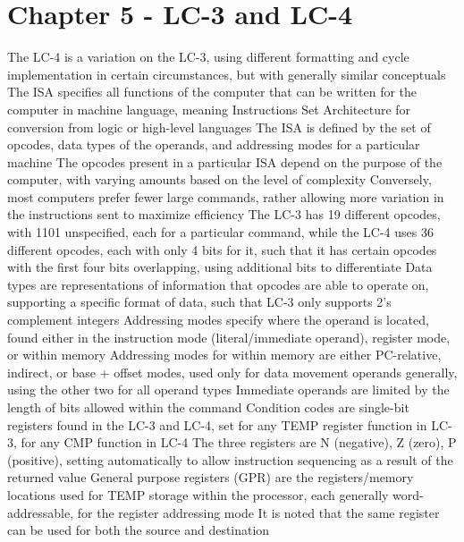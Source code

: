 \documentclass[11 pt, twoside]{article}
\newenvironment{outline*}
{
	\begin{outline}[enumerate]
	}
	{\end{outline}
}
\begin{document}
\section{Chapter 5 - LC-3 and LC-4}
\begin{outline*}
\1 The LC-4 is a variation on the LC-3, using different formatting and cycle implementation in certain circumstances, but with generally similar conceptuals
\1 The ISA specifies all functions of the computer that can be written for the computer in machine language, meaning Instructions Set Architecture for conversion from logic or high-level languages
\2 The ISA is defined by the set of opcodes, data types of the operands, and addressing modes for a particular machine
\1 The opcodes present in a particular ISA depend on the purpose of the computer, with varying amounts based on the level of complexity
\2 Conversely, most computers prefer fewer large commands, rather allowing more variation in the instructions sent to maximize efficiency
\2 The LC-3 has 19 different opcodes, with 1101 unspecified, each for a particular command, while the LC-4 uses 36 different opcodes, each with only 4 bits for it, such that it has certain opcodes with the first four bits overlapping, using additional bits to differentiate
\1 Data types are representations of information that opcodes are able to operate on, supporting a specific format of data, such that LC-3 only supports 2's complement integers
\1 Addressing modes specify where the operand is located, found either in the instruction mode (literal/immediate operand), register mode, or within memory
\2 Addressing modes for within memory are either PC-relative, indirect, or base + offset modes, used only for data movement operands generally, using the other two for all operand types
\2 Immediate operands are limited by the length of bits allowed within the command
\1 Condition codes are single-bit registers found in the LC-3 and LC-4, set for any TEMP register function in LC-3, for any CMP function in LC-4
\2 The three registers are N (negative), Z (zero), P (positive), setting automatically to allow instruction sequencing as a result of the returned value
\1 General purpose registers (GPR) are the registers/memory locations used for TEMP storage within the processor, each generally word-addressable, for the register addressing mode
\2 It is noted that the same register can be used for both the source and destination
\end{outline*}
\end{document}
